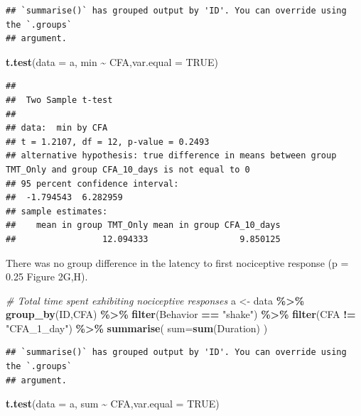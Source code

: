 \documentclass[
]{book}
\newenvironment{Shaded}{\begin{snugshade}}{\end{snugshade}}
\newcommand{\AttributeTok}[1]{\textcolor[rgb]{0.13,0.29,0.53}{#1}}
\newcommand{\CommentTok}[1]{\textcolor[rgb]{0.56,0.35,0.01}{\textit{#1}}}
\newcommand{\ConstantTok}[1]{\textcolor[rgb]{0.56,0.35,0.01}{#1}}
\newcommand{\FunctionTok}[1]{\textcolor[rgb]{0.13,0.29,0.53}{\textbf{#1}}}
\newcommand{\NormalTok}[1]{#1}
\newcommand{\OtherTok}[1]{\textcolor[rgb]{0.56,0.35,0.01}{#1}}
\newcommand{\SpecialCharTok}[1]{\textcolor[rgb]{0.81,0.36,0.00}{\textbf{#1}}}
\newcommand{\StringTok}[1]{\textcolor[rgb]{0.31,0.60,0.02}{#1}}
\begin{document}
\begin{verbatim}
## `summarise()` has grouped output by 'ID'. You can override using the `.groups`
## argument.
\end{verbatim}

\begin{Shaded}
\begin{Highlighting}[]
\FunctionTok{t.test}\NormalTok{(}\AttributeTok{data =}\NormalTok{ a, min }\SpecialCharTok{\textasciitilde{}}\NormalTok{ CFA,}\AttributeTok{var.equal =} \ConstantTok{TRUE}\NormalTok{)}
\end{Highlighting}
\end{Shaded}

\begin{verbatim}
## 
##  Two Sample t-test
## 
## data:  min by CFA
## t = 1.2107, df = 12, p-value = 0.2493
## alternative hypothesis: true difference in means between group TMT_Only and group CFA_10_days is not equal to 0
## 95 percent confidence interval:
##  -1.794543  6.282959
## sample estimates:
##    mean in group TMT_Only mean in group CFA_10_days 
##                 12.094333                  9.850125
\end{verbatim}

There was no group difference in the latency to first nociceptive response (p = 0.25 Figure 2G,H).

\begin{Shaded}
\begin{Highlighting}[]
\CommentTok{\# Total time spent exhibiting nociceptive responses}
\NormalTok{a }\OtherTok{\textless{}{-}}\NormalTok{ data }\SpecialCharTok{\%\textgreater{}\%}
  \FunctionTok{group\_by}\NormalTok{(ID,CFA) }\SpecialCharTok{\%\textgreater{}\%}
  \FunctionTok{filter}\NormalTok{(Behavior }\SpecialCharTok{==} \StringTok{"shake"}\NormalTok{) }\SpecialCharTok{\%\textgreater{}\%}
  \FunctionTok{filter}\NormalTok{(CFA }\SpecialCharTok{!=} \StringTok{"CFA\_1\_day"}\NormalTok{) }\SpecialCharTok{\%\textgreater{}\%}
  \FunctionTok{summarise}\NormalTok{(}
    \AttributeTok{sum=}\FunctionTok{sum}\NormalTok{(Duration)}
\NormalTok{  )}
\end{Highlighting}
\end{Shaded}

\begin{verbatim}
## `summarise()` has grouped output by 'ID'. You can override using the `.groups`
## argument.
\end{verbatim}

\begin{Shaded}
\begin{Highlighting}[]
\FunctionTok{t.test}\NormalTok{(}\AttributeTok{data =}\NormalTok{ a, sum }\SpecialCharTok{\textasciitilde{}}\NormalTok{ CFA,}\AttributeTok{var.equal =} \ConstantTok{TRUE}\NormalTok{)}
\end{Highlighting}
\end{Shaded}
\end{document}
